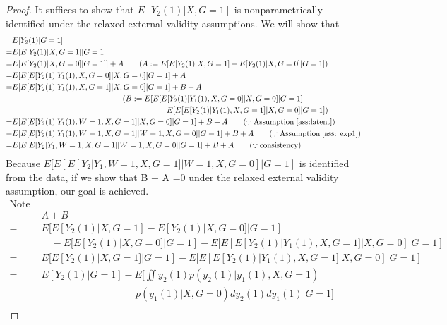 \documentclass[uplatex,dvipdfmx]{jsarticle}
\begin{document}
\begin{proof}
    It suffices to show that $E[ Y_2(1) | X, G= 1]$ is nonparametrically identified under the relaxed external validity assumptions. We will show that
    \begin{align*}
    &E[ Y_2(1) | G=1 ]\\
    =& E [E[ Y_2(1) | X, G=1 ] | G=1] \\
    =& E[ E[ Y_2(1) | X, G= 0 ] | G=1] ] + A
    \qquad ( A: = E[ E[ Y_2(1) | X, G =1 ] - E[ Y_2(1) | X, G =0 ] | G=1]) \\
    =& E[ E[ E[ Y_2(1) |  Y_1(1), X, G= 0 ] | X, G =0] | G=1 ]   + A \\
    =& E[ E[ E[ Y_2(1) | Y_1(1), X, G=1 ] | X, G =0] | G=1] + B + A \\
    &\hspace{5cm}( B: =E[ E[ E[ Y_2(1)| Y_1(1), X, G=0 ] | X, G = 0] | G = 1] -\\
    &\hspace{7cm} E[ E[ E[ Y_2(1)| Y_1(1), X, G=1 ] | X, G = 0] | G = 1] ) \\
    =& E[ E[ E[ Y_2(1) | Y_1(1), W=1, X, G=1] | X, G=0] | G=1] + B + A \qquad( \because  \text{Assumption}\; \ref{ass:latent} ) \\
    =& E[ E[ E[ Y_2(1) | Y_1(1), W=1, X, G=1] | W=1,X, G=0] | G=1] + B + A\qquad( \because \text{Assumption}\; \ref{ass: exp1}) \\
    =& E[ E[ E[ Y_2 | Y_1 , W=1, X, G=1] | W=1, X, G=0] | G=1] + B + A\qquad (\because \text{consistency} )
    \end{align*}
    Because $E[ E[ E[ Y_2 | Y_1 , W=1, X, G=1] | W=1, X, G=0] | G=1]$ is identified from the data, if we show that B + A =0 under the relaxed external validity assumption, our goal is achieved.
    \begin{align*}
    \text{Note that } \\
    &A + B\\
    =& E[ E[ Y_2(1) | X, G=1] - E[ Y_2(1) | X, G= 0 ] | G=1]  \\
    & \quad-  E[ E[ Y_2(1)| X, G = 0] | G = 1] - E[ E[ E[ Y_2(1)| Y_1(1), X, G=1 ] | X, G = 0] | G = 1] \\
    =& E[ E[ Y_2(1) | X, G=1] | G=1] - E[ E[ E[ Y_2(1)| Y_1(1), X, G=1 ] | X, G = 0] | G = 1] \\
    =& E[ Y_2(1) | G=1] - E\biggl[ \iint y_2(1)  p(y_2(1) | y_1(1), X, G=1)\\
    &\hspace{4cm} p( y_1(1) | X, G=0) dy_2(1) dy_1(1) \bigg| G=1 \biggr] \\

\end{align*}
\end{proof}
\end{document}
